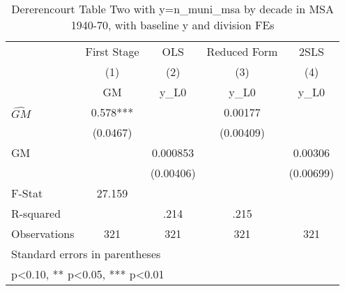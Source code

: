 \begin{table}[htbp]\centering
\def\sym#1{\ifmmode^{#1}\else\(^{#1}\)\fi}
\caption{Dererencourt Table Two with y=n\_muni\_msa by decade in MSA 1940-70, with baseline y and division FEs}
\begin{tabular}{l*{4}{c}}
\toprule
                    & First Stage   &         OLS   &Reduced Form   &        2SLS   \\
                    &\multicolumn{1}{c}{(1)}&\multicolumn{1}{c}{(2)}&\multicolumn{1}{c}{(3)}&\multicolumn{1}{c}{(4)}\\
                    &\multicolumn{1}{c}{GM}&\multicolumn{1}{c}{y\_L0}&\multicolumn{1}{c}{y\_L0}&\multicolumn{1}{c}{y\_L0}\\
\midrule
$\hat{GM}$          &       0.578***&               &     0.00177   &               \\
                    &    (0.0467)   &               &   (0.00409)   &               \\
\addlinespace
GM                  &               &    0.000853   &               &     0.00306   \\
                    &               &   (0.00406)   &               &   (0.00699)   \\
\midrule
F-Stat              &      27.159   &               &               &               \\
R-squared           &               &        .214   &        .215   &               \\
Observations        &         321   &         321   &         321   &         321   \\
\bottomrule
\multicolumn{5}{l}{\footnotesize Standard errors in parentheses}\\
\multicolumn{5}{l}{\footnotesize * p<0.10, ** p<0.05, *** p<0.01}\\
\end{tabular}
\end{table}

